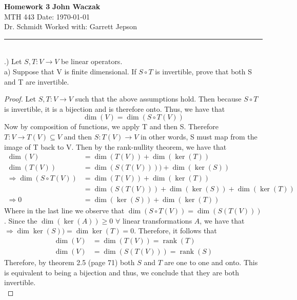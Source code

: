 \documentclass[a4paper, 11pt]{article}
\newenvironment{solution}{%
	\begin{list}{}{%
			\setlength{\topsep}{0pt}%
			\setlength{\leftmargin}{1.5cm}%
			\setlength{\rightmargin}{1.5cm}%
			\setlength{\listparindent}{\parindent}%
			\setlength{\itemindent}{\parindent}%
			\setlength{\parsep}{\parskip}%
		}%
		\item[]}{\end{list}}
\begin{document}
\noindent
\large\textbf{Homework 3} \hfill \textbf{John Waczak} \\
\normalsize MTH 443 \hfill  Date: \today \\
Dr. Schmidt \hfill Worked with: Garrett Jepson 
\par\noindent\rule{\textwidth}{0.4pt} \\

.) Let $S,T:V\to V$ be linear operators. \\

\noindent a) Suppose that V is finite dimensional. If $S\circ T$ is invertible, prove that both S and T are invertible.\\
	\begin{solution}
		\begin{proof}
			Let $S,T:V\to V$ such that the above assumptions hold. Then because $S\circ T$ is invertible, it is a bijection and is therefore onto. Thus, we have that 
				\begin{equation*}
					\dim(V) = \dim(S\circ T(V))
				\end{equation*}
			Now by composition of functions, we apply T and then S. Therefore $T:V \to T(V)\subseteq V$ and then $S:T(V)\to V$ in other words, S must map from the image of T back to V. Then by the rank-nullity theorem, we have that
				\begin{align*}
					\dim(V) &= \dim(T(V))+\dim(\ker(T)) \\ 
					\dim(T(V)) &= \dim(S(T(V)))) + \dim(\ker(S)) \\ 
					\Rightarrow \dim(S\circ T(V)) &= \dim(T(V))+\dim(\ker(T)) \\ 
						&= \dim(S(T(V))) + \dim(\ker(S)) + \dim(\ker(T)) \\ 
					\Rightarrow 0 &= \dim(\ker(S))+\dim(\ker(T))
				\end{align*} 
			Where in the last line we observe that $\dim(S\circ T(V))=\dim(S(T(V)))$. Since the $\dim(\ker(A))\geq 0$ $\forall$ linear transformations $A$, we have that $\Rightarrow \dim\ker(S)) = \dim\ker(T) = 0$. Therefore, it follows that 
				\begin{align*}
					\dim(V) &= \dim(T(V)) = \operatorname{rank}(T) \\ 
					\dim(V) &= \dim(S(T(V))) = \operatorname{rank}(S)
				\end{align*}
			Therefore, by theorem 2.5 (page 71) both $S$ and $T$ are one to one and onto. This is equivalent to being a bijection and thus, we conclude that they are both invertible. \\
		\end{proof}
	\end{solution}
\end{document}
